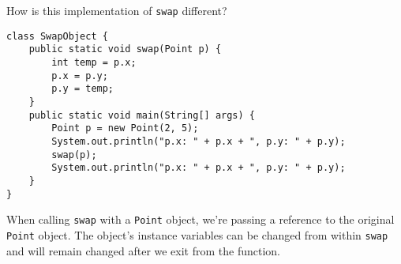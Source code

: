 \question How is this implementation of \texttt{swap} different?

\begin{lstlisting}
class SwapObject {
    public static void swap(Point p) {
        int temp = p.x;
        p.x = p.y;
        p.y = temp;
    }
    public static void main(String[] args) {
        Point p = new Point(2, 5);
        System.out.println("p.x: " + p.x + ", p.y: " + p.y);
        swap(p);
        System.out.println("p.x: " + p.x + ", p.y: " + p.y);
    }
}
\end{lstlisting}

\begin{solution}
When calling \texttt{swap} with a \texttt{Point} object, we're passing a reference to the original \texttt{Point} object. The object's instance variables can be changed from within \texttt{swap} and will remain changed after we exit from the function.
\end{solution}
